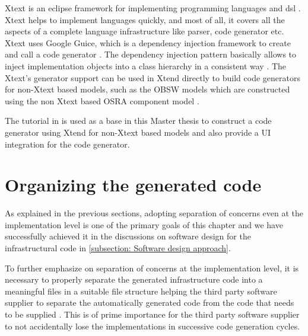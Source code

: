 Xtext is an eclipse framework for implementing programming languages and \ac{dsl} \cite{Xtend}. Xtext helps to implement languages quickly, and most of all, it covers all the aspects of a complete language infrastructure like parser, code generator etc. Xtext uses Google Guice, which is a dependency injection framework to create and call a code generator \cite{Xtend}. The dependency injection pattern basically allows to inject implementation objects into a class hierarchy in a consistent way \cite{InvOfCntrlurl}. The Xtext's generator support can be used in Xtend directly to build code generators for non-Xtext based models, such as the OBSW models which are constructed using the non Xtext based OSRA component model \cite{CodeGenEclXtend}. 

The tutorial in \cite{CodeGenNonXtext} is used as a base in this Master thesis to construct a code generator using Xtend for non-Xtext based models and also provide a UI integration for the code generator.

\section{Organizing the generated code}
\label{section: Code organization}
As explained in the previous sections, adopting separation of concerns even at the implementation level is one of the primary goals of this chapter and we have successfully achieved it in the discussions on software design for the infrastructural code in \cref{subsection: Software design approach}. 

To further emphasize on separation of concerns at the implementation level, it is necessary to properly separate the generated infrastructure code into a meaningful files in a suitable file structure helping the third party software supplier to separate the automatically generated code from the code that needs to be supplied \cite{MDSDBook}. This is of prime importance for the third party software supplier to not accidentally lose the implementations in successive code generation cycles. 

